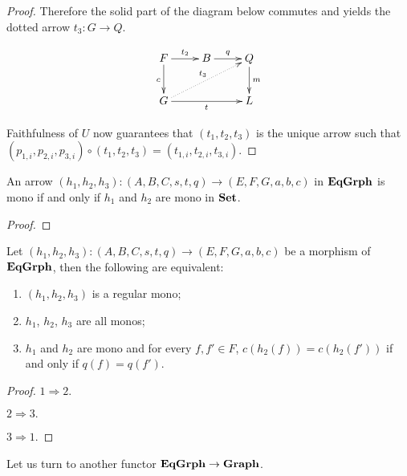 \begin{proof}
	Therefore the solid part of the diagram below commutes and  yields the dotted arrow $t_3\colon G\to Q$.
	
	\[\xymatrix{F \ar[r]^{t_2} \ar[d]_{c}& B \ar[r]^{q} & Q \ar[d]^{m}\\G \ar[rr]_{t} \ar@{.>}[urr]^{t_3}&& L}\]
	
	Faithfulness of $U$ now guarantees that $(t_1, t_2, t_3)$ is the unique arrow such that $(p_{1,i}, p_{2,i}, p_{3,i})\circ(t_1, t_2, t_3)=(t_{1,i},t_{2, i}, t_{3,i})$.	
\end{proof}




\begin{cor}
	An arrow $(h_1, h_2, h_3)\colon (A, B, C, s,t, q)\to (E, F, G, a,b,c)$ in $\mathbf{EqGrph}$ is mono if and only if $h_1$ and $h_2$ are mono in $\mathbf{Set}$.
\end{cor}
\begin{proof}
\end{proof}



\begin{cor}\label{cor:regmono}Let $(h_1, h_2, h_3)\colon (A, B, C, s,t, q)\to (E, F, G, a,b,c)$ be a morphism of $\mathbf{EqGrph}$, then the following are equivalent:
	\begin{enumerate}
		\item $(h_1, h_2, h_3)$ is a regular mono;
		\item $h_1$, $h_2$, $h_3$ are all monos;
		\item $h_1$ and $h_2$ are mono and for every $f, f'\in F$, $c(h_2(f))=c(h_2(f'))$ if and only if $q(f)=q(f')$.
	\end{enumerate}
\end{cor}
\begin{proof}
	$1\Rightarrow 2.$  
	
	\smallskip \noindent
	$2\Rightarrow 3.$ 
	
	\smallskip \noindent 
	$3\Rightarrow 1.$
\end{proof}

Let us turn to another functor $\mathbf{EqGrph}\to \mathbf{Graph}$.


